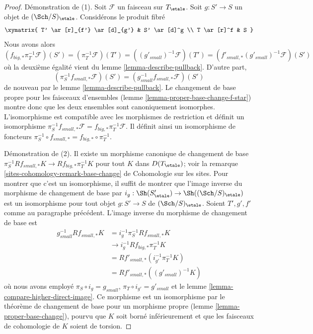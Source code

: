 \begin{proof}
Démonstration de (1). Soit $\mathcal{F}$ un faisceau sur $T_\etale$.
Soit $g : S' \to S$ un objet de $(\Sch/S)_\etale$. Considérons le
produit fibré
$$
\xymatrix{
T' \ar[r]_{f'} \ar[d]_{g'} & S' \ar[d]^g \\
T \ar[r]^f & S
}
$$
Nous avons alors
$$
(f_{big, *}\pi_T^{-1}\mathcal{F})(S') =
(\pi_T^{-1}\mathcal{F})(T') =
((g'_{small})^{-1}\mathcal{F})(T')  =
(f'_{small, *}(g'_{small})^{-1}\mathcal{F})(S')
$$
où la deuxième égalité vient du lemme \ref{lemma-describe-pullback}.
D'autre part,
$$
(\pi_S^{-1}f_{small, *}\mathcal{F})(S') =
(g_{small}^{-1}f_{small, *}\mathcal{F})(S')
$$
de nouveau par le lemme \ref{lemma-describe-pullback}.
Le changement de base propre pour les faisceaux d'ensembles
(lemme \ref{lemma-proper-base-change-f-star})
montre donc que les deux ensembles sont canoniquement isomorphes.
L'isomorphisme est compatible avec les morphismes de restriction
et définit un isomorphisme
$\pi_S^{-1}f_{small, *}\mathcal{F} = f_{big, *}\pi_T^{-1}\mathcal{F}$.
Il définit ainsi un isomorphisme de foncteurs
$\pi_S^{-1} \circ f_{small, *} = f_{big, *} \circ \pi_T^{-1}$.

\medskip\noindent
Démonstration de (2). Il existe un morphisme canonique de changement de base
$\pi_S^{-1}Rf_{small, *}K \to Rf_{big, *}\pi_T^{-1}K$
pour tout $K$ dans $D(T_\etale)$; voir la
remarque \ref{sites-cohomology-remark-base-change} de Cohomologie sur les sites.
Pour montrer que c'est un isomorphisme, il suffit de montrer que l'image inverse du
morphisme de changement de base par $i_g : \Sh(S'_\etale) \to \Sh((\Sch/S)_\etale)$
est un isomorphisme pour tout objet $g : S' \to S$ de $(\Sch/S)_\etale$.
Soient $T', g', f'$ comme au paragraphe précédent.
L'image inverse du morphisme de changement de base est
\begin{align*}
g_{small}^{-1}Rf_{small, *}K
& =
i_g^{-1}\pi_S^{-1}Rf_{small, *}K \\
& \to
i_g^{-1}Rf_{big, *}\pi_T^{-1}K \\
& =
Rf'_{small, *}(i_{g'}^{-1}\pi_T^{-1}K) \\
& =
Rf'_{small, *}((g'_{small})^{-1}K)
\end{align*}
où nous avons employé $\pi_S \circ i_g = g_{small}$,
$\pi_T \circ i_{g'} = g'_{small}$ et le
lemme \ref{lemma-compare-higher-direct-image}.
Ce morphisme est un isomorphisme par le théorème de changement de base pour un morphisme propre
(lemme \ref{lemma-proper-base-change}), pourvu que $K$ soit borné
inférieurement et que les faisceaux de cohomologie de $K$ soient de torsion.


\end{proof}
